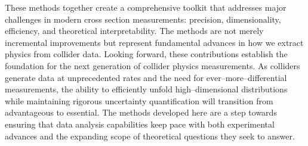         These methods together create a comprehensive toolkit that addresses major challenges in modern cross section measurements: precision, dimensionality, efficiency, and theoretical interpretability.
        The methods are not merely incremental improvements but represent fundamental advances in how we extract physics from collider data.
        Looking forward, these contributions establish the foundation for the next generation of collider physics measurements.
        As colliders generate data at unprecedented rates and the need for ever--more--differential measurements, the ability to efficiently unfold high--dimensional distributions while maintaining rigorous uncertainty quantification will transition from advantageous to essential.
        The methods developed here are a step towards ensuring that data analysis capabilities keep pace with both experimental advances and the expanding scope of theoretical questions they seek to answer.